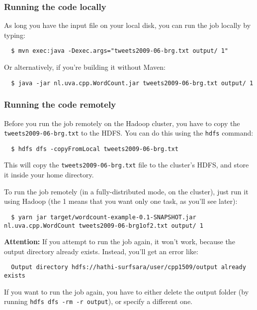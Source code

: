 \documentclass[a4paper,11pt]{article}
\begin{document}
\subsubsection{Running the code locally}

As long you have the input file on your local disk, you can run the job locally by typing:

\begin{lstlisting}
  $ mvn exec:java -Dexec.args="tweets2009-06-brg.txt output/ 1"
\end{lstlisting}

Or alternatively, if you're building it without Maven:

\begin{lstlisting}
  $ java -jar nl.uva.cpp.WordCount.jar tweets2009-06-brg.txt output/ 1 
\end{lstlisting}

\subsubsection{Running the code remotely}

Before you run the job remotely on the Hadoop cluster, you have to copy the \texttt{tweets2009-06-brg.txt} to the HDFS. You can do this
using the \texttt{hdfs} command:

\begin{lstlisting}
  $ hdfs dfs -copyFromLocal tweets2009-06-brg.txt
\end{lstlisting}

This will copy the \texttt{tweets2009-06-brg.txt} file to the cluster's HDFS, and store it inside your home directory.

To run the job remotely (in a fully-distributed mode, on the cluster), just run it using Hadoop (the 1 means that you want
only one task, as you'll see later):
\begin{lstlisting}
  $ yarn jar target/wordcount-example-0.1-SNAPSHOT.jar nl.uva.cpp.WordCount tweets2009-06-brg1of2.txt output/ 1
\end{lstlisting}

\textbf{Attention:} If you attempt to run the job again, it won't work, because the output directory already exists. Instead, you'll get an error like:
\begin{lstlisting}
  Output directory hdfs://hathi-surfsara/user/cpp1509/output already exists
\end{lstlisting}

If you want to run the job again, you have to either delete the output folder (by running \texttt{hdfs dfs -rm -r output}), or specify a different one. 
\end{document}
